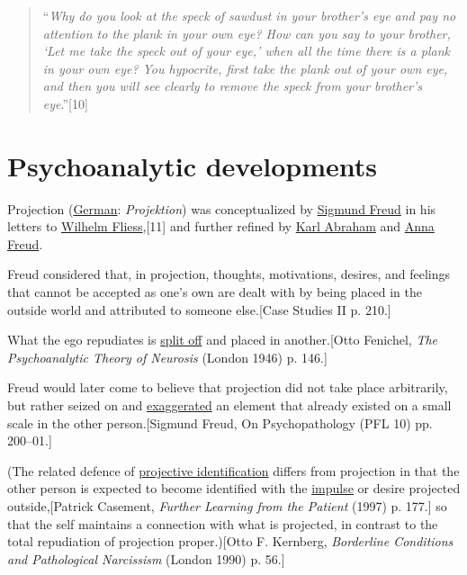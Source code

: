 \documentclass{book}
\numberwithin{equation}{section}
\begin{document}
\begin{quotation}
    ``\textit{Why do you look at the speck of sawdust in your brother's eye and pay no attention to the plank in your own eye? How can you say to your brother, `Let me take the speck out of your eye,' when all the time there is a plank in your own eye? You hypocrite, first take the plank out of your own eye, and then you will see clearly to remove the speck from your brother's eye}.''[10]
\end{quotation}

\section{Psychoanalytic developments}
Projection (\href{https://en.wikipedia.org/wiki/German_language}{German}: \textit{Projektion}) was conceptualized by \href{https://en.wikipedia.org/wiki/Sigmund_Freud}{Sigmund Freud} in his letters to \href{https://en.wikipedia.org/wiki/Wilhelm_Fliess}{Wilhelm Fliess},[11] and further refined by \href{https://en.wikipedia.org/wiki/Karl_Abraham}{Karl Abraham} and \href{https://en.wikipedia.org/wiki/Anna_Freud}{Anna Freud}.

Freud considered that, in projection, thoughts, motivations, desires, and feelings that cannot be accepted as one's own are dealt with by being placed in the outside world and attributed to someone else.[Case Studies II p. 210.]

What the ego repudiates is \href{https://en.wikipedia.org/wiki/Splitting_(psychology)}{split off} and placed in another.[Otto Fenichel, \textit{The Psychoanalytic Theory of Neurosis} (London 1946) p. 146.]

%
Freud would later come to believe that projection did not take place arbitrarily, but rather seized on and \href{https://en.wikipedia.org/wiki/Exaggerated}{exaggerated} an element that already existed on a small scale in the other person.[Sigmund Freud, On Psychopathology (PFL 10) pp. 200--01.]

(The related defence of \href{https://en.wikipedia.org/wiki/Projective_identification}{projective identification} differs from projection in that the other person is expected to become identified with the \href{https://en.wikipedia.org/wiki/Impulse_(psychology)}{impulse} or desire projected outside,[Patrick Casement, \textit{Further Learning from the Patient} (1997) p. 177.] so that the self maintains a connection with what is projected, in contrast to the total repudiation of projection proper.)[Otto F. Kernberg, \textit{Borderline Conditions and Pathological Narcissism} (London 1990) p. 56.]
\end{document}
